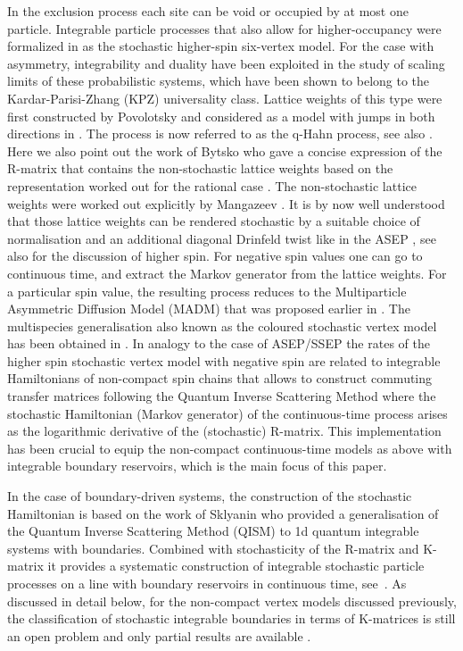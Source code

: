 \documentclass[11pt]{article}
\numberwithin{equation}{section}
\begin{document}
In the exclusion process each site can be void or occupied by at most one particle.
Integrable particle processes that also allow for higher-occupancy were formalized in \cite{borodin2016stochastic,2016arXiv160105770B,2016CMaPh.343..651C}  as the stochastic higher-spin six-vertex model. For the case with asymmetry, integrability and duality have been exploited in the
study of scaling limits of these  probabilistic systems, which have been shown to belong to the Kardar-Parisi-Zhang (KPZ) universality class. 
Lattice weights of this type were first constructed by Povolotsky \cite{povolotsky2013integrability} and considered as a model with jumps in both directions in \cite{barraquand2016q}. The process is now referred to as the  q-Hahn process, see also  \cite{8203134}. Here we also point out the work of Bytsko \cite{Bytsko:2001uh} who gave a concise expression of the R-matrix that contains the non-stochastic lattice weights based on the representation worked out for the rational case \cite{Faddeev:1996iy}. The non-stochastic lattice weights were  worked out explicitly by Mangazeev \cite{Mangazeev:2014gwa}. It is by now well understood that those lattice weights can be rendered stochastic by a suitable choice of normalisation and an additional diagonal Drinfeld twist like in the ASEP \cite{deGier:2005zz}, see also \cite{Kuniba:2016fpi} for the discussion of higher spin. For negative spin values one can go to continuous time, and extract the Markov generator from the lattice weights. 
For a particular spin value, the resulting process reduces  to the Multiparticle Asymmetric Diffusion Model (MADM) that was proposed  earlier in \cite{sasamoto1998one}. The multispecies generalisation also known as the coloured stochastic vertex model has been obtained in \cite{Kuniba:2016fpi,2018arXiv180801866B}.  In analogy to the case of ASEP/SSEP the rates of the higher spin stochastic vertex model with negative spin are related to integrable Hamiltonians of non-compact spin chains \cite{Frassek:2019vjt,Frassek:2019isa} that allows to construct commuting transfer matrices following the Quantum Inverse Scattering Method \cite{Faddeev:1996iy} where the stochastic Hamiltonian (Markov generator) of the continuous-time process arises as the logarithmic derivative of the (stochastic) R-matrix. This implementation has been crucial to equip the non-compact continuous-time models as above with integrable boundary reservoirs, which is the main focus of this paper.

In the case of boundary-driven systems, the construction of the stochastic Hamiltonian is based on the work of Sklyanin \cite{Sklyanin:1988yz} who provided a generalisation of the Quantum Inverse Scattering Method (QISM) to 1d quantum integrable systems with boundaries. Combined with stochasticity of the R-matrix and K-matrix it provides a systematic construction of integrable stochastic particle processes on a line with boundary reservoirs in continuous time, see~\cite{crampe2014integrable}. As discussed in detail below, for the non-compact vertex models discussed previously, the classification of stochastic integrable boundaries in terms of K-matrices is still an open problem and only partial results are available \cite{2014JPhA...47C5202L,2019NuPhB.94514665M,2024JPhA...57x5201K,Frassek:2019vjt,Frassek:2022fjs}.
\end{document}
